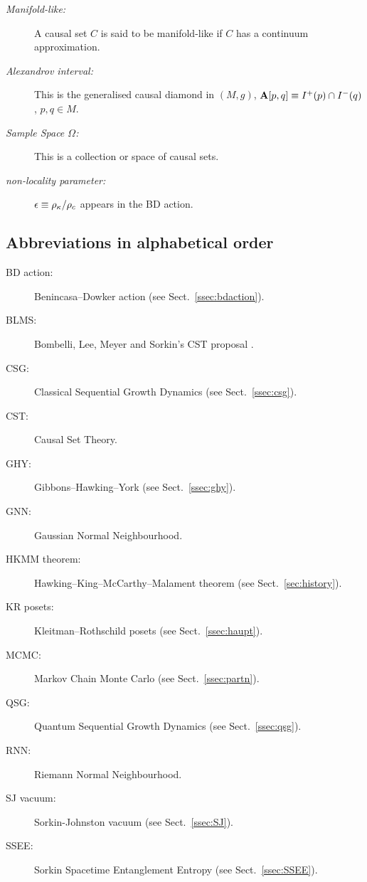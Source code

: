 \begin{description}
     \item[\textit{Manifold-like:}] A causal set $C$ is said to be manifold-like if $C$ has a continuum approximation.
     \item[\textit{Alexandrov interval:}] This is the generalised causal diamond in $(M,g)$,   $\mathbf A[p,q]\equiv
          I^+(p)\cap I^-(q)$, $p,q \in M$.
    
     \item[\textit{Sample Space $\Omega$:}] This is a collection or  space of causal sets.
     \item[\textit{non-locality parameter:}] $\epsilon \equiv {\rho_\kappa}/{\rho_c}$  appears in the BD action. 
  \end{description} 

    
\subsection*{Abbreviations in alphabetical order}

    \begin{description}
       \item[BD action:] Benincasa--Dowker action (see Sect.~\ref{ssec:bdaction}). 
       \item[BLMS:] Bombelli, Lee, Meyer and Sorkin's CST proposal \citep{blms}.
       \item[CSG:] Classical Sequential Growth Dynamics  (see Sect.~\ref{ssec:csg}). 
       \item[CST:] Causal Set Theory. 
       \item[GHY:] Gibbons--Hawking--York  (see Sect.~\ref{ssec:ghy}). 
       \item[GNN:] Gaussian Normal Neighbourhood.  
       \item[HKMM theorem:] Hawking--King--McCarthy--Malament theorem (see Sect.~\ref{sec:history}).  
       \item[KR posets:] Kleitman--Rothschild posets (see Sect.~\ref{ssec:haupt}). 
       \item[MCMC:] Markov Chain Monte Carlo (see Sect.~\ref{ssec:partn}). 
       \item[QSG:] Quantum Sequential Growth Dynamics (see Sect.~\ref{ssec:qsg}). 
       \item[RNN:] Riemann Normal Neighbourhood. 
       \item[SJ vacuum:] Sorkin-Johnston vacuum (see Sect.~\ref{ssec:SJ}). 
       \item[SSEE:] Sorkin Spacetime Entanglement Entropy  (see Sect.~\ref{ssec:SSEE}).
    \end{description} 

